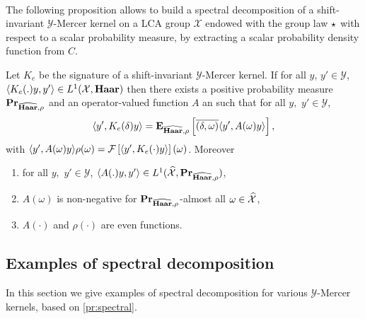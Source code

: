 \documentclass[twoside,11pt]{article}
\begin{document}
\paragraph{}
The following proposition allows to build a spectral decomposition of a
shift-invariant $\mathcal{Y}$-Mercer kernel on a \acs{LCA} group $\mathcal{X}$
endowed with the group law $\star$ with respect to a scalar probability
measure, by extracting a scalar probability density function from $C$.
\begin{proposition}
\label{pr:spectral}
    Let $K_e$ be the signature of a shift-invariant $\mathcal{Y}$-Mercer
    kernel. If for all $y$, $y' \in\mathcal{Y}$, $\langle K_e(.)y,y'\rangle\in
    L^1(\mathcal{X},\mathbf{Haar})$ then there exists a positive probability measure
    ${\mathbf{{Pr}}}_{\widehat{\mathbf{Haar}},\rho}$ and an operator-valued function $A$ an
    such that for all $y,$ $y'\in\mathcal{Y}$,
    \begin{dmath}
        \label{eq:expectation_spec} \inner{y', K_e(\delta)y}
        =\expectation_{\dual{\Haar},\rho}\left[\conj{\pairing{\delta,
        \omega}}\inner{y', A(\omega)y}\right],
    \end{dmath}
    with $\langle y', A(\omega)y\rangle\rho(\omega) = \mathcal{F}\left[\langle y',
    K_e(\cdot)y\rangle\right](\omega)$.  Moreover
    \begin{enumerate}
        \item for all $y,$ $y'\in\mathcal{Y}$, $\langle A(.)y,y'\rangle\in
        L^1(\widehat{\mathcal{X}}, {\mathbf{{Pr}}}_{\widehat{\mathbf{Haar}},\rho})$,
        \item $A(\omega)$ is non-negative for
        ${\mathbf{{Pr}}}_{\widehat{\mathbf{Haar}},\rho}$-almost all
        $\omega\in\widehat{\mathcal{X}}$,
        \item $A(\cdot)$ and $\rho(\cdot)$ are even functions.
    \end{enumerate}
\end{proposition}
\subsection{Examples of spectral decomposition}
\label{subsec:dec_examples}
In this section we give examples of spectral decomposition for various
$\mathcal{Y}$-Mercer kernels, based on \cref{pr:spectral}.
\end{document}
